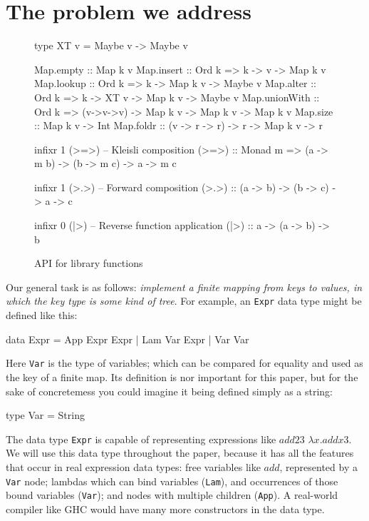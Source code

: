\documentclass[acmsmall]{acmart}
\theoremstyle{theorem}
\theoremstyle{definition}
\theoremstyle{remark}
\newenvironment{figurebox}{\begin{figure}}{\end{figure}}
\begin{document}
\section{The problem we address}
\begin{figurebox}
\begin{code}
type XT v = Maybe v -> Maybe v

Map.empty     :: Map k v
Map.insert    :: Ord k => k -> v -> Map k v
Map.lookup    :: Ord k => k -> Map k v -> Maybe v
Map.alter     :: Ord k => k -> XT v -> Map k v -> Maybe v
Map.unionWith :: Ord k => (v->v->v) -> Map k v -> Map k v -> Map k v
Map.size      :: Map k v -> Int
Map.foldr     :: (v -> r -> r) -> r -> Map k v -> r


infixr 1 (>=>)  -- Kleisli composition
(>=>) :: Monad m => (a -> m b) -> (b -> m c) -> a -> m c

infixr 1 (>.>)   -- Forward composition
(>.>)  :: (a -> b) -> (b -> c) -> a -> c

infixr 0 (|>)   -- Reverse function application
(|>)  :: a -> (a -> b) -> b
\end{code}
\caption{API for library functions}
\label{fig:containers} \label{fig:library}
\end{figurebox}

Our general task is as follows: \emph{implement a finite mapping from keys to values,
in which the key type is some kind of tree}.
For example, an \lstinline{Expr} data type might be defined like this:
\begin{code}
data Expr = App Expr Expr | Lam  Var Expr | Var Var
\end{code}
Here \lstinline{Var} is the type of variables; which can be compared for
equality and used as the key of a finite map.  Its definition is nor important
for this paper, but for the sake of concretemess
you could imagine it being defined simply as a string:
\begin{code}
  type Var = String
\end{code}
The data type \lstinline{Expr} is capable of representing expressions like $add 2 3$
$\lambda x. add x 3$.  We will use this data type throughout the paper, because it
has all the features that occur in real expression data types: free variables like $add$, represented by a \lstinline{Var} node;
lambdas which can bind variables (\lstinline{Lam}), and occurrences of those bound variables (\lstinline{Var});
and nodes with multiple children (\lstinline{App}).  A real-world compiler like GHC would have
many more constructors in the data type.
\end{document}
